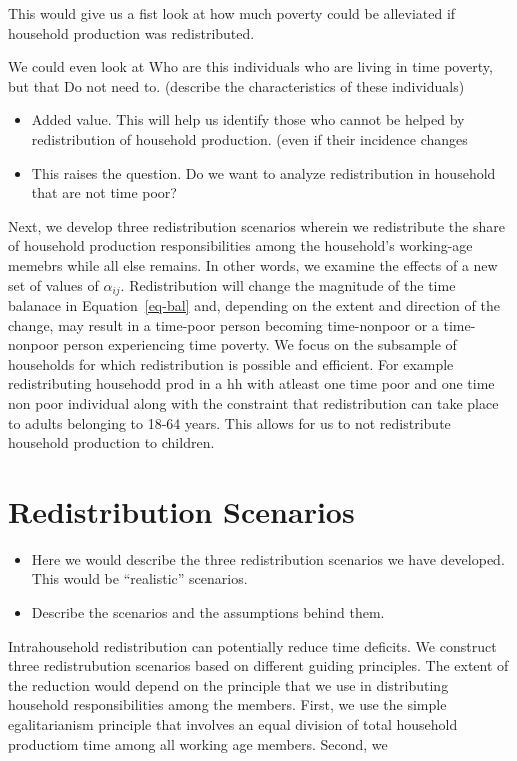 \documentclass[
  11pt,
]{article}
\begin{document}
This would give us a fist look at how much poverty could be alleviated
if household production was redistributed.

We could even look at Who are this individuals who are living in time
poverty, but that Do not need to. (describe the characteristics of these
individuals)

\begin{itemize}
\item
  Added value. This will help us identify those who cannot be helped by
  redistribution of household production. (even if their incidence
  changes
\item
  This raises the question. Do we want to analyze redistribution in
  household that are not time poor?
\end{itemize}

Next, we develop three redistribution scenarios wherein we redistribute
the share of household production responsibilities among the household's
working-age memebrs while all else remains. In other words, we examine
the effects of a new set of values of \(\alpha_{ij}\). Redistribution
will change the magnitude of the time balanace in Equation~\ref{eq-bal}
and, depending on the extent and direction of the change, may result in
a time-poor person becoming time-nonpoor or a time-nonpoor person
experiencing time poverty. We focus on the subsample of households for
which redistribution is possible and efficient. For example
redistributing househodd prod in a hh with atleast one time poor and one
time non poor individual along with the constraint that redistribution
can take place to adults belonging to 18-64 years. This allows for us to
not redistribute household production to children.

\section{Redistribution Scenarios}\label{redistribution-scenarios}

\begin{itemize}
\item
  Here we would describe the three redistribution scenarios we have
  developed. This would be ``realistic'' scenarios.
\item
  Describe the scenarios and the assumptions behind them.
\end{itemize}

Intrahousehold redistribution can potentially reduce time deficits. We
construct three redistrubution scenarios based on different guiding
principles. The extent of the reduction would depend on the principle
that we use in distributing household responsibilities among the
members. First, we use the simple egalitarianism principle that involves
an equal division of total household productiom time among all working
age members. Second, we
\end{document}
